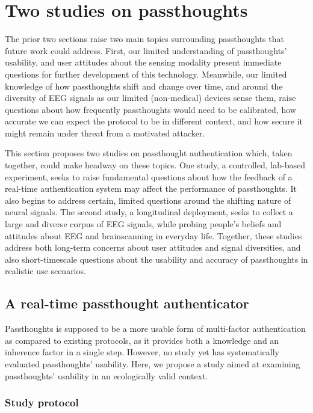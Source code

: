\documentclass[sigconf]{acmart}
\begin{document}
\section{Two studies on passthoughts}
\label{sec:orgda992dc}

The prior two sections raise two main topics surrounding passthoughts that future work could address. 
First, our limited understanding of passthoughts' usability, and user attitudes about the sensing modality present immediate questions for further development of this technology.
Meanwhile, our limited knowledge of how passthoughts shift and change over time, and around the diversity of EEG signals as our limited (non-medical) devices sense them,
raise questions about how frequently passthoughts would need to be calibrated, how accurate we can expect the protocol to be in different context, and how secure it might remain under threat from a motivated attacker.

This section proposes two studies on passthought authentication which, taken together, could make headway on these topics.
One study, a controlled, lab-based experiment, seeks to raise fundamental questions about how the feedback of a real-time authentication system may affect the performance of passthoughts.
It also begins to address certain, limited questions around the shifting nature of neural signals.
The second study, a longitudinal deployment, seeks to collect a large and diverse corpus of EEG signals, while probing people's beliefs and attitudes about EEG and brainscanning in everyday life.
Together, these studies address both long-term concerns about user attitudes and signal diversities, and also short-timescale questions about the usability and accuracy of passthoughts in realistic use scenarios.

\subsection{A real-time passthought authenticator}
\label{sec:org647a2bd}

Passthoughts is supposed to be a more usable form of multi-factor authentication
as compared to existing protocols,
as it provides both a knowledge and an inherence factor in a single step.
However, no study yet has systematically evaluated passthoughts' usability.
Here, we propose a study aimed at examining passthoughts' usability in an ecologically valid context.

\subsubsection{Study protocol}
\label{sec:org5f58e5b}
\end{document}
